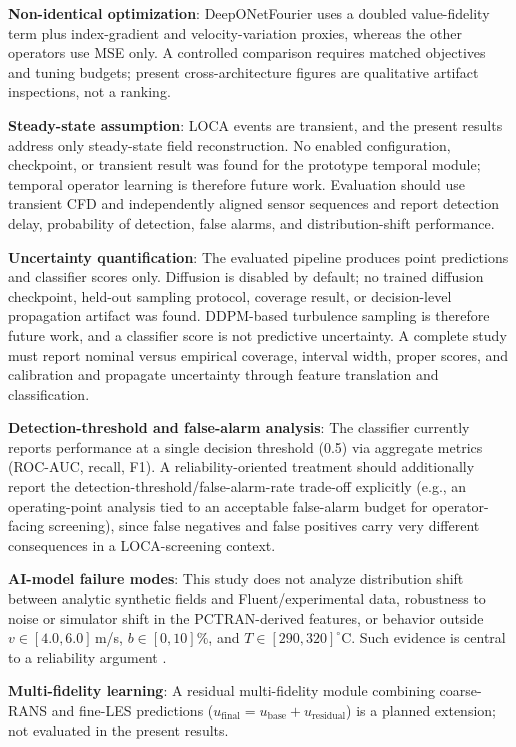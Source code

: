 \documentclass[journal]{IEEEtran}
\newcommand{\added}[1]{#1}
\begin{document}
\textbf{Non-identical optimization}: DeepONetFourier uses a doubled value-fidelity term plus index-gradient and velocity-variation proxies, whereas the other operators use MSE only. A controlled comparison requires matched objectives and tuning budgets; present cross-architecture figures are qualitative artifact inspections, not a ranking.

\textbf{Steady-state assumption}: LOCA events are transient, and the present results address only steady-state field reconstruction.  \added{No enabled configuration, checkpoint, or transient result was found for the prototype temporal module; temporal operator learning is therefore future work. Evaluation should use transient CFD and independently aligned sensor sequences and report detection delay, probability of detection, false alarms, and distribution-shift performance.}

\textbf{Uncertainty quantification}: The evaluated pipeline produces point predictions and classifier scores only.  \added{Diffusion is disabled by default; no trained diffusion checkpoint, held-out sampling protocol, coverage result, or decision-level propagation artifact was found. DDPM-based turbulence sampling is therefore future work, and a classifier score is not predictive uncertainty. A complete study must report nominal versus empirical coverage, interval width, proper scores, and calibration and propagate uncertainty through feature translation and classification.}

\textbf{Detection-threshold and false-alarm analysis}: The classifier currently reports performance at a single decision threshold (0.5) via aggregate metrics (ROC-AUC, recall, F1). A reliability-oriented treatment should additionally report the detection-threshold/false-alarm-rate trade-off explicitly (e.g., an operating-point analysis tied to an acceptable false-alarm budget for operator-facing screening), since false negatives and false positives carry very different consequences in a LOCA-screening context.

\textbf{AI-model failure modes}: This study does not analyze distribution shift between analytic synthetic fields and Fluent/experimental data, robustness to noise or simulator shift in the PCTRAN-derived features, or behavior outside $v\in[4.0,6.0]$\,m/s, $b\in[0,10]\%$, and $T\in[290,320]^\circ$C. Such evidence is central to a reliability argument \cite{nrc7294,trilateral2024}.

\textbf{Multi-fidelity learning}: A residual multi-fidelity module combining coarse-RANS and fine-LES predictions ($u_\text{final} = u_\text{base} + u_\text{residual}$) is a planned extension; not evaluated in the present results.
\end{document}
